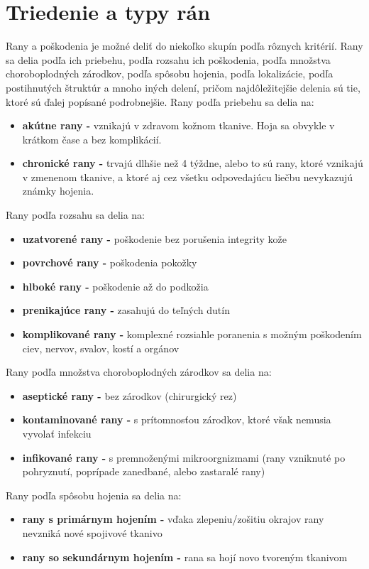 \section{Triedenie a typy rán}
Rany a poškodenia je možné deliť do niekoľko skupín podľa rôznych kritérií. Rany sa delia podľa ich priebehu, podľa rozsahu ich poškodenia, podľa množstva choroboplodných zárodkov, podľa spôsobu hojenia, podľa lokalizácie, podľa postihnutých štruktúr a mnoho iných delení, pričom najdôležitejšie delenia sú tie, ktoré sú ďalej popísané podrobnejšie.
Rany podľa priebehu sa delia na:
\begin{itemize} 
\item \textbf{akútne rany -} vznikajú v zdravom kožnom tkanive. Hoja sa obvykle v krátkom čase a bez komplikácií.
\item \textbf{chronické rany -} trvajú dlhšie než 4 týždne, alebo to sú rany, ktoré vznikajú v zmenenom tkanive, a ktoré aj cez všetku odpovedajúcu liečbu nevykazujú známky hojenia.
\end{itemize}
Rany podľa rozsahu sa delia na:
\begin{itemize} 
\item \textbf{uzatvorené rany -} poškodenie bez porušenia integrity kože
\item \textbf{povrchové rany -} poškodenia pokožky
\item \textbf{hlboké rany -} poškodenie až do podkožia
\item \textbf{prenikajúce rany -} zasahujú do teľných dutín
\item \textbf{komplikované rany -} komplexné rozsiahle poranenia s možným poškodením ciev, nervov, svalov, kostí a orgánov
\end{itemize}
Rany podľa množstva choroboplodných zárodkov sa delia na:
\begin{itemize} 
\item \textbf{aseptické rany -} bez zárodkov (chirurgický rez)
\item \textbf{kontaminované rany -} s prítomnosťou zárodkov, ktoré však nemusia vyvolať infekciu
\item \textbf{infikované rany -} s premnoženými mikroorgnizmami (rany vzniknuté po pohryznutí, poprípade zanedbané, alebo zastaralé rany)
\end{itemize}
Rany podľa spôsobu hojenia sa delia na:
\begin{itemize} 
\item \textbf{rany s primárnym hojením -} vďaka zlepeniu/zošitiu okrajov rany nevzniká nové spojivové tkanivo
\item \textbf{rany so sekundárnym hojením -} rana sa hojí novo tvoreným tkanivom
\end{itemize}

